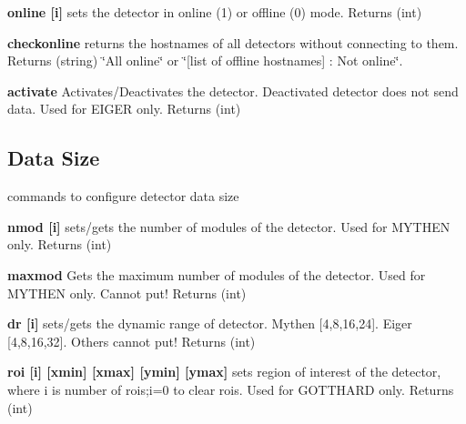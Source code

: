\begin{DoxyItemize}
\item {\bfseries online \mbox{[}i\mbox{]}} sets the detector in online (1) or offline (0) mode. {\ttfamily Returns} {\ttfamily }(int)
\end{DoxyItemize}


\begin{DoxyItemize}
\item {\bfseries checkonline} returns the hostnames of all detectors without connecting to them. {\ttfamily Returns} (string) \char`\"{}All online\char`\"{} or \char`\"{}\mbox{[}list of offline hostnames\mbox{]} : Not online\char`\"{}.
\end{DoxyItemize}


\begin{DoxyItemize}
\item {\bfseries activate} Activates/Deactivates the detector. Deactivated detector does not send data. Used for EIGER only. {\ttfamily Returns} {\ttfamily }(int)
\end{DoxyItemize}\hypertarget{config_configsize}{}\subsection{Data Size}\label{config_configsize}
commands to configure detector data size


\begin{DoxyItemize}
\item {\bfseries nmod \mbox{[}i\mbox{]}} sets/gets the number of modules of the detector. Used for MYTHEN only. {\ttfamily Returns} {\ttfamily }(int)
\end{DoxyItemize}


\begin{DoxyItemize}
\item {\bfseries maxmod } Gets the maximum number of modules of the detector. Used for MYTHEN only. Cannot put! {\ttfamily Returns} {\ttfamily }(int)
\end{DoxyItemize}


\begin{DoxyItemize}
\item {\bfseries dr \mbox{[}i\mbox{]}} sets/gets the dynamic range of detector. Mythen \mbox{[}4,8,16,24\mbox{]}. Eiger \mbox{[}4,8,16,32\mbox{]}. Others cannot put! {\ttfamily Returns} {\ttfamily }(int)
\end{DoxyItemize}


\begin{DoxyItemize}
\item {\bfseries roi \mbox{[}i\mbox{]} \mbox{[}xmin\mbox{]} \mbox{[}xmax\mbox{]} \mbox{[}ymin\mbox{]} \mbox{[}ymax\mbox{]} } sets region of interest of the detector, where i is number of rois;i=0 to clear rois. Used for GOTTHARD only. {\ttfamily Returns} {\ttfamily }(int)
\end{DoxyItemize}


